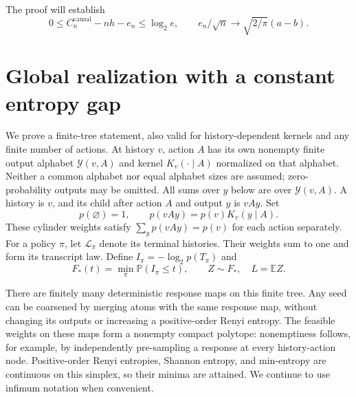 \documentclass[11pt,a4paper]{article}
\newcommand{\E}{\mathbb E}
\newcommand{\Prob}{\mathbb P}
\newcommand{\causal}{\mathrm{causal}}
\begin{document}
The proof will establish
\begin{equation}\label{eq:twoingredients}
0\le C_n^{\causal}-nh-e_n\le\log_2e,
\qquad e_n/\sqrt n\longrightarrow\sqrt{2/\pi}(a-b).
\end{equation}

\section{Global realization with a constant entropy gap}
We prove a finite-tree statement, also valid for history-dependent
kernels and any finite number of actions. At history $v$, action $A$
has its own nonempty finite output alphabet $\mathcal Y(v,A)$ and
kernel $K_v(\cdot\mid A)$ normalized on that alphabet. Neither a
common alphabet nor equal alphabet sizes are assumed; zero-probability
outputs may be omitted. All sums over $y$ below are over $\mathcal Y(v,A)$.
A history is $v$, and its child after action $A$ and output $y$ is $vAy$. Set
\[
p(\varnothing)=1,\qquad p(vAy)=p(v)K_v(y\mid A).
\]
These cylinder weights satisfy
$\sum_y p(vAy)=p(v)$ for each action separately. For a policy $\pi$,
let $\mathcal L_\pi$ denote its terminal histories. Their weights sum
to one and form its transcript law. Define $I_\pi=-\log_2p(T_\pi)$ and
\[
F_*(t)=\min_\pi\Prob(I_\pi\le t),\qquad Z\sim F_*,\quad L=\E Z.
\]

There are finitely many deterministic response maps on this finite tree.
Any seed can be coarsened by merging atoms with the same response map,
without changing its outputs or increasing a positive-order Renyi entropy.
The feasible weights on these maps form a nonempty compact polytope:
nonemptiness follows, for example, by independently pre-sampling a response
at every history-action node. Positive-order Renyi entropies, Shannon
entropy, and min-entropy are continuous on this simplex, so their minima
are attained. We continue to use infimum notation when convenient.
\end{document}
